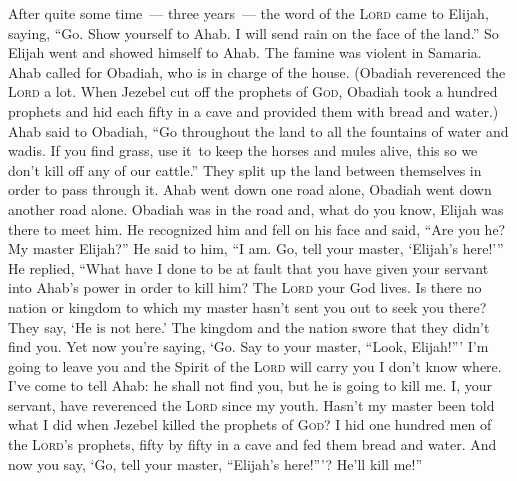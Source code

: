 
\begin{inparaenum}
   After quite some time~--- three years~--- the word of the \textsc{Lord} came to Elijah, saying, ``Go. Show yourself to Ahab. I will send rain on the face of the land.''%
   So Elijah went and showed himself to Ahab. The famine was violent in Samaria.%
   Ahab called for Obadiah, who is in charge of the house. (Obadiah reverenced the \textsc{Lord} a lot.%
   When Jezebel cut off the prophets of \textsc{God}, Obadiah took a hundred prophets and hid each fifty in a cave and provided them with bread and water.)%
   Ahab said to Obadiah, ``Go throughout the land to all the fountains of water and wadis. If you find grass, use it\understood\ to keep the horses and mules alive, this so we don't kill off any of our cattle.''%
   They split up the land between themselves in order to pass through it. Ahab went down one road alone, Obadiah went down another road alone.%
   Obadiah was in the road and, what do you know, Elijah was there to meet him. He recognized him and fell on his face and said, ``Are you he? My master Elijah?''%
   He said to him, ``I am. Go, tell your master, `Elijah's here!'\thinspace''%
   He replied, ``What have I done to be at fault that you have given your servant into Ahab's power in order to kill him?%
   The \textsc{Lord} your God lives. Is there no nation or kingdom to which my master hasn't sent you out to seek you there? They say, `He is not here.' The kingdom and the nation swore that they didn't find you.%
   Yet now you're saying, `Go. Say to your master, ``Look, Elijah!''\thinspace'%
   I'm going to leave you and the Spirit of the \textsc{Lord} will carry you I don't know where. I've come to tell Ahab: he shall not find you, but he is going to kill me. I, your servant, have reverenced the \textsc{Lord} since my youth.%
   Hasn't my master been told what I did when Jezebel killed the prophets of \textsc{God}? I hid one hundred men of the \textsc{Lord}'s prophets, fifty by fifty in a cave and fed them bread and water.%
   And now you say, `Go, tell your master, ``Elijah's here!''\thinspace'? He'll kill me!''%
  

\end{inparaenum}
